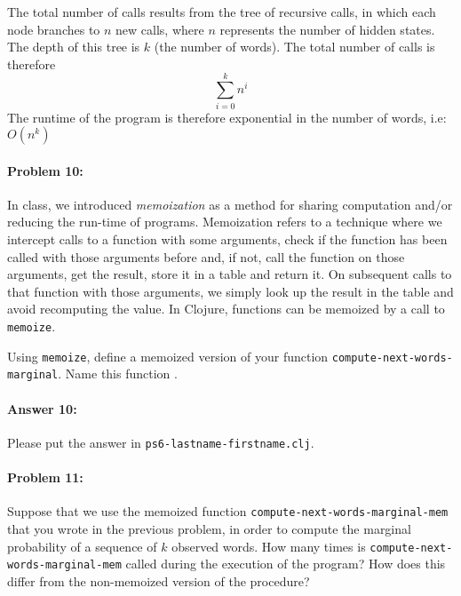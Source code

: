 \documentclass[10pt]{article}
\newenvironment{AnswerBox}{\begin{mdframed}[style=simple]}{\end{mdframed}}
\newcommand{\required}[1]{{\color{blue}{#1}}}
\newcommand{\PSnum}{6}
\begin{document}
\begin{AnswerBox}%

    The total number of calls results from the tree of recursive calls, in which each node branches to $n$ new calls, where $n$ represents the number of hidden states. The depth of this tree is $k$ (the number of words). The total number of calls is therefore
    \begin{equation*}
        \sum_{i=0}^{k} n^i
    \end{equation*}
    The runtime of the program is therefore exponential in the number of words, i.e:
    $O(n^k)$

\end{AnswerBox}%

\hrulefill%

\paragraph{Problem 10:}
In class, we introduced \emph{memoization} as a method for sharing
computation and/or reducing the run-time of programs. Memoization
refers to a technique where we intercept calls to a function with some
arguments, check if the function has been called with those arguments
before and, if not, call the function on those arguments, get the
result, store it in a table and return it. On subsequent calls to that
function with those arguments, we simply look up the result in the
table and avoid recomputing the value. In Clojure, functions can be
memoized by a call to \texttt{memoize}.

Using \texttt{memoize}, define a memoized version of your function
\texttt{compute-next-words-marginal}. Name this function
\required{\texttt{compute-next-words-marginal-mem}}.

\paragraph{Answer 10:} Please put the answer in
\texttt{ps\PSnum-lastname-firstname.clj}.

\hrulefill%

\paragraph{Problem 11:}
Suppose that we use the memoized function
\texttt{compute-next-words-marginal-mem} that you wrote in the
previous problem, in order to compute the marginal probability of a
sequence of $k$ observed words. How many times is
\texttt{compute-next-words-marginal-mem} called during the execution
of the program? How does this differ from the non-memoized version of
the procedure?
\end{document}
